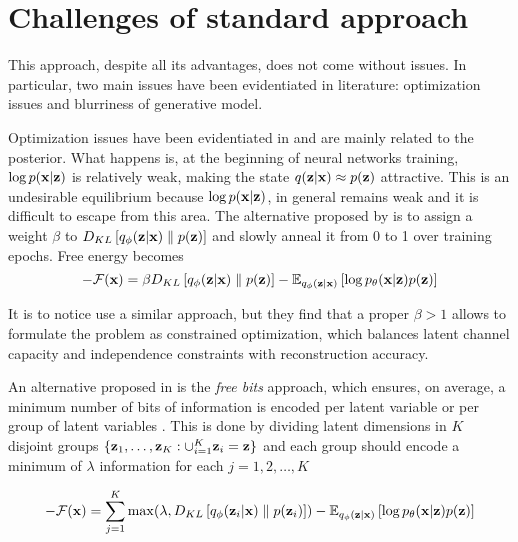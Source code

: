 \documentclass[12pt]{article}
\begin{document}
\section{Challenges of standard approach}
This approach, despite all its advantages, does not come without issues. In particular, two main issues have been evidentiated in literature: optimization issues and blurriness of generative model.

Optimization issues have been evidentiated in \cite{VAEIntro}\cite{bowman-etal-2015-large}\cite{Snderby2016LadderVA} and are mainly related to the posterior. What happens is, at the beginning of neural networks training, \(\log p (\textbf{x}|\textbf{z})\) is relatively weak, making the state \(q(\textbf{z}|\textbf{x}) \approx p(\textbf{z})\) attractive. This is an undesirable equilibrium because \(\log p (\textbf{x}|\textbf{z})\), in general remains weak and it is difficult to escape from this area. The alternative proposed by \cite{bowman-etal-2015-large}\cite{Snderby2016LadderVA} is to assign a weight \(\beta\) to \(D_{KL}\left[ q_{\phi}(\textbf{z}|\textbf{x}) \parallel p(\textbf{z}) \right]\) and slowly anneal it from 0 to 1 over training epochs. Free energy becomes
\begin{equation}
    -\mathcal{F}(\textbf{x}) = \beta D_{KL}\left[ q_{\phi}(\textbf{z}|\textbf{x}) \parallel p(\textbf{z}) \right] - \mathbb{E}_{q_{\phi}(\textbf{z}|\textbf{x})} \left[ \log p_{\theta}(\textbf{x}|\textbf{z})p(\textbf{z}) \right]
\end{equation}

It is to notice \cite{Higgins2016betaVAELB} use a similar approach, but they find that a proper \(\beta > 1\) allows to formulate the problem as constrained optimization, which balances latent channel capacity and independence constraints with reconstruction accuracy. 


An alternative proposed in \cite{Kingma2016ImprovedVI} is the \textit{free bits} approach, which ensures, on average, a minimum number of bits of information is encoded per latent variable or per group of latent variables \cite{VAEIntro}. This is done by dividing latent dimensions in \(K\) disjoint groups \(\{\textbf{z}_1,\ldots,\textbf{z}_K: \cup_{i=1}^K\textbf{z}_i = \textbf{z}\}\) and each group should encode a minimum of \(\lambda\) information for each \(j=1,2,\ldots, K\)

\begin{equation}
    -\mathcal{F}(\textbf{x}) = \sum_{j=1}^K \max(\lambda, D_{KL}\left[ q_{\phi}(\textbf{z}_i|\textbf{x}) \parallel p(\textbf{z}_i) \right]) - \mathbb{E}_{q_{\phi}(\textbf{z}|\textbf{x})} \left[ \log p_{\theta}(\textbf{x}|\textbf{z})p(\textbf{z}) \right]
\end{equation}
\end{document}
